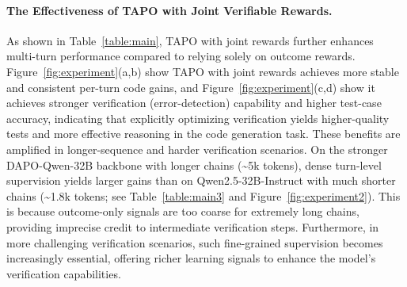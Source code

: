 \documentclass{article} %
\begin{document}
\paragraph{The Effectiveness of TAPO with Joint Verifiable Rewards.} 
As shown in Table~\ref{table:main}, TAPO with joint rewards further enhances multi-turn performance compared to relying solely on outcome rewards. Figure~\ref{fig:experiment}(a,b) show TAPO with joint rewards achieves more stable and consistent per-turn code gains, and Figure~\ref{fig:experiment}(c,d) show it achieves stronger verification (error-detection) capability and higher test-case accuracy, indicating that explicitly optimizing verification yields higher-quality tests and more effective reasoning in the code generation task.
These benefits are amplified in longer-sequence and harder verification scenarios. On the stronger DAPO-Qwen-32B backbone with longer chains (\textasciitilde5k tokens), dense turn-level supervision yields larger gains than on Qwen2.5-32B-Instruct with much shorter chains (\textasciitilde1.8k tokens; see Table~\ref{table:main3} and Figure~\ref{fig:experiment2}). This is because outcome-only signals are too coarse for extremely long chains, providing imprecise credit to intermediate verification steps. Furthermore, in more challenging verification scenarios, such fine-grained supervision becomes increasingly essential, offering richer learning signals to enhance the model’s verification capabilities.
\end{document}
